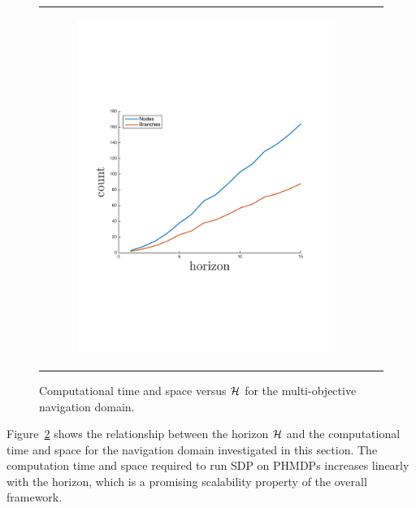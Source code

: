 \begin{figure}[ht]
\begin{tabular}{cc}
            \begin{subfigure}[b]{0.24\textwidth}\centering \includegraphics[width=\textwidth]{images/space_plot_new}
                \label{fig:space_complexity}\end{subfigure}
            \\
        \end{tabular}
        \caption{Computational time and space versus {\footnotesize $ \mathcal{H} $} for the multi-objective navigation domain.}
        \label{fig:time_space_complexity}    
        \vspace{-3mm}
    \end{figure}

Figure~\ref{fig:time_space_complexity} shows the relationship between the horizon {\footnotesize $ \mathcal{H} $} and the computational time and space for the navigation domain investigated in this section. The computation time and space required to run SDP on PHMDPs increases linearly with the horizon, which is a promising scalability property of the overall framework.